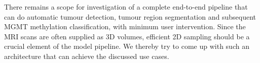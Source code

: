 \vspace*{3mm} 
There remains a scope for investigation of a complete end-to-end pipeline that can do automatic tumour detection, tumour region segmentation and subsequent MGMT methylation classification, with minimum user intervention. Since the MRI scans are often supplied as 3D volumes, efficient 2D sampling should be a crucial element of the model pipeline. We thereby try to come up with such an architecture that can achieve the discussed use cases.  










